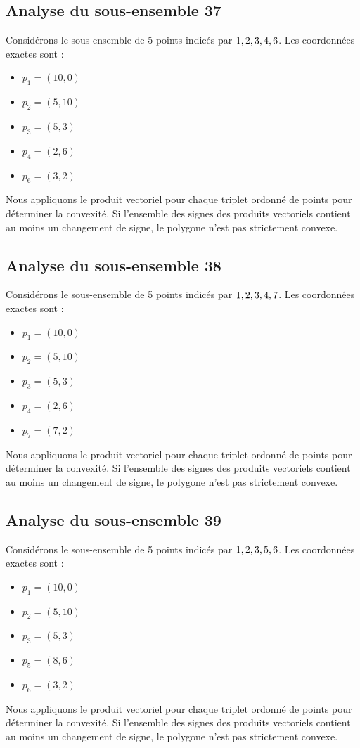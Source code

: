 \documentclass[11pt]{article}
\begin{document}
\subsection{Analyse du sous-ensemble 37}
Considérons le sous-ensemble de 5 points indicés par $\\{ 1, 2, 3, 4, 6 \\}$.
Les coordonnées exactes sont :
\begin{itemize}
\item $p_1 = (10, 0)$
\item $p_2 = (5, 10)$
\item $p_3 = (5, 3)$
\item $p_4 = (2, 6)$
\item $p_6 = (3, 2)$
\end{itemize}
Nous appliquons le produit vectoriel pour chaque triplet ordonné de points pour déterminer la convexité. Si l'ensemble des signes des produits vectoriels contient au moins un changement de signe, le polygone n'est pas strictement convexe.
\newpage

\subsection{Analyse du sous-ensemble 38}
Considérons le sous-ensemble de 5 points indicés par $\\{ 1, 2, 3, 4, 7 \\}$.
Les coordonnées exactes sont :
\begin{itemize}
\item $p_1 = (10, 0)$
\item $p_2 = (5, 10)$
\item $p_3 = (5, 3)$
\item $p_4 = (2, 6)$
\item $p_7 = (7, 2)$
\end{itemize}
Nous appliquons le produit vectoriel pour chaque triplet ordonné de points pour déterminer la convexité. Si l'ensemble des signes des produits vectoriels contient au moins un changement de signe, le polygone n'est pas strictement convexe.
\newpage

\subsection{Analyse du sous-ensemble 39}
Considérons le sous-ensemble de 5 points indicés par $\\{ 1, 2, 3, 5, 6 \\}$.
Les coordonnées exactes sont :
\begin{itemize}
\item $p_1 = (10, 0)$
\item $p_2 = (5, 10)$
\item $p_3 = (5, 3)$
\item $p_5 = (8, 6)$
\item $p_6 = (3, 2)$
\end{itemize}
Nous appliquons le produit vectoriel pour chaque triplet ordonné de points pour déterminer la convexité. Si l'ensemble des signes des produits vectoriels contient au moins un changement de signe, le polygone n'est pas strictement convexe.
\newpage
\end{document}
